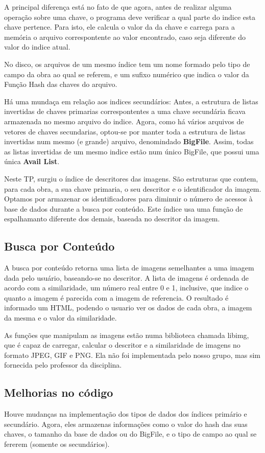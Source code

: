 \documentclass[10pt,a4paper,draft]{article}
\begin{document}
A principal diferença está no fato de que agora, antes de realizar alguma
operação sobre uma chave, o programa deve verificar a qual parte do indice esta
chave pertence. Para isto, ele calcula o valor da  da chave
e carrega para a memória o arquivo correspontente ao valor encontrado, caso seja
diferente do valor do indice atual.

No disco, os arquivos de um mesmo índice tem um nome formado pelo tipo de campo
da obra ao qual se referem, e um sufixo numérico que indica o valor da Função
Hash das chaves do arquivo.

Há uma mundaça em relação aos indices secundários: Antes, a estrutura de listas
invertidas de chaves primarias correspontentes a uma chave secundária ficava
armazenada no mesmo arquivo do indice. Agora, como há vários arquivos de
vetores de chaves secundarias, optou-se por manter toda a estrutura de listas
invertidas num mesmo (e grande) arquivo, denomindado \textbf{BigFile}. Assim,
todas as listas invertidas de um mesmo indice estão num único BigFile, que possui uma
única \textbf{Avail List}.

Neste TP, surgiu o índice de descritores das imagens. São estruturas que
contem, para cada obra, a sua chave primaria, o seu descritor e o identificador
da imagem. Optamos por armazenar os identificadores para diminuir o número de
acessos à base de dados durante a \textsf{busca por conteúdo}. Este índice usa
uma função de espalhamanto diferente dos demais, baseada no descritor da imagem.

\subsection{Busca por Conteúdo}
A busca por conteúdo retorna uma lista de imagens semelhantes a uma imagem dada
pelo usuário, baseando-se no descritor. A lista de imagens é ordenada de acordo
com a similaridade, um número real entre 0 e 1, inclusive, que indice o quanto
a imagem é parecida com a imagem de referencia. O resultado é informado um
HTML, podendo o usuario ver os dados de cada obra, a imagem da mesma e o valor
da similaridade.

As funções que manipulam as imagens estão numa biblioteca chamada libimg, que é
capaz de carregar, calcular o descritor e a similaridade de imagens no formato
JPEG, GIF e PNG. Ela não foi implementada pelo nosso grupo, mas sim
fornecida pelo professor da disciplina.

\newpage 
\subsection{Melhorias no código}
Houve mudanças na implementação dos tipos de dados dos índices primário e
secundário. Agora, eles armazenas informações como o valor do hash das suas
chaves, o tamanho da base de dados ou do BigFile, e o tipo de campo ao qual 
se fererem (somente os secundários).
\end{document}
